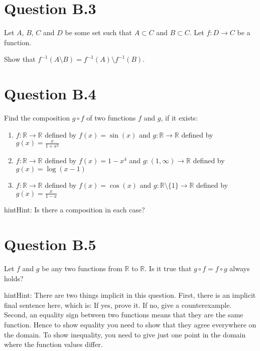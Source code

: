 \documentclass[letterpaper,10pt,english]{jupyterBook}
\begin{document}
\section{Question B.3}
\label{\detokenize{03.exercises:question-b-3}}
\sphinxAtStartPar
Let \(A\), \(B\), \(C\) and \(D\) be some set such that \(A \subset C\) and \(B \subset C\).
Let \(f\colon D \rightarrow C\) be a function.

\sphinxAtStartPar
Show that \(f^{-1}(A \setminus B) = f^{-1}(A) \setminus f^{-1}(B)\).


\section{Question B.4}
\label{\detokenize{03.exercises:question-b-4}}
\sphinxAtStartPar
Find the composition \(g \circ f\) of two functions \(f\) and \(g\), if it exists:
\begin{enumerate}
%
\item {} 
\sphinxAtStartPar
\(f \colon \mathbb{R} \rightarrow \mathbb{R}\) defined by \(f(x)=\sin(x)\) and \(g \colon \mathbb{R} \rightarrow \mathbb{R}\) defined by \(g(x)= \frac{x}{1+x^2}\)

\item {} 
\sphinxAtStartPar
\(f \colon \mathbb{R} \rightarrow \mathbb{R}\) defined by \(f(x)= 1-x^4\) and \(g \colon (1,\infty) \rightarrow \mathbb{R}\) defined by \(g(x)= \log(x-1)\)

\item {} 
\sphinxAtStartPar
\(f \colon \mathbb{R} \rightarrow \mathbb{R}\) defined by \(f(x)=\cos(x)\) and \(g \colon \mathbb{R}\setminus\{1\} \rightarrow \mathbb{R}\) defined by \(g(x)= \frac{x}{1-x}\)

\end{enumerate}

\begin{sphinxadmonition}{hint}{Hint:}
\sphinxAtStartPar
Is there a composition in each case?
\end{sphinxadmonition}


\section{Question B.5}
\label{\detokenize{03.exercises:question-b-5}}
\sphinxAtStartPar
Let \(f\) and \(g\) be any two functions from \(\mathbb{R}\) to \(\mathbb{R}\).  Is it true that
\(g \circ f = f \circ g\) always holds?

\begin{sphinxadmonition}{hint}{Hint:}
\sphinxAtStartPar
There are two
things implicit in this question.  First, there is an implicit final
sentence here, which is: If yes, prove it.  If no, give a
counterexample.  Second, an equality sign between two functions means
that they are the same function.  Hence to show equality you need to
show that they agree everywhere on the domain.  To show inequality,
you need to give just one point in the domain where the function
values differ.
\end{sphinxadmonition}
\end{document}
